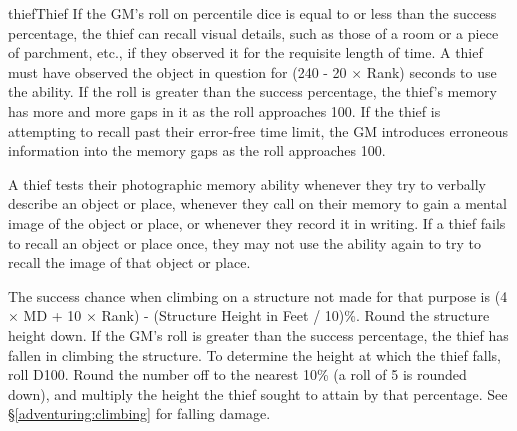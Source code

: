 \begin{Skill}[1.2]{thief}{Thief}
If the GM’s roll on percentile dice is equal to or less than the
success percentage, the thief can recall visual details, such as those
of a room or a piece of parchment, etc., if they observed it for the
requisite length of time.  A thief must have observed the object in
question for (240 - 20 × Rank) seconds to use the ability. If the roll
is greater than the success percentage, the thief’s memory has more
and more gaps in it as the roll approaches 100.  If the thief is
attempting to recall past their error-free time limit, the GM
introduces erroneous information into the memory gaps as the roll
approaches 100.

A thief tests their photographic memory ability whenever they try to
verbally describe an object or place, whenever they call on their
memory to gain a mental image of the object or place, or whenever they
record it in writing. If a thief fails to recall an object or place
once, they may not use the ability again to try to recall the image of
that object or place.



The success chance when climbing on a structure not made for that
purpose is (4 × MD + 10 × Rank) - (Structure Height in Feet / 10)\%.
Round the structure height down.  If the GM’s roll is greater than the
success percentage, the thief has fallen in climbing the structure.
To determine the height at which the thief falls, roll D100. Round the
number off to the nearest 10\% (a roll of 5 is rounded down), and
multiply the height the thief sought to attain by that percentage.
See \S\ref{adventuring:climbing} for falling damage.

\end{Skill}

